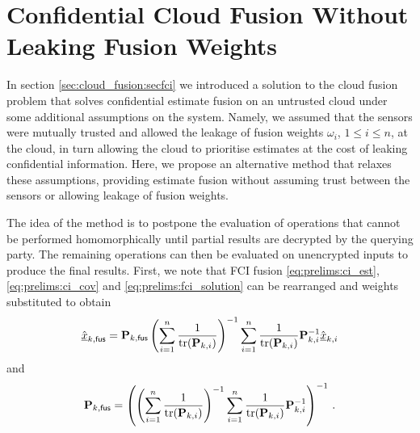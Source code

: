 \section{Confidential Cloud Fusion Without Leaking Fusion Weights}\label{sec:cloud_fusion:secfci2}
In section \ref{sec:cloud_fusion:secfci} we introduced a solution to the cloud fusion problem that solves confidential estimate fusion on an untrusted cloud under some additional assumptions on the system. Namely, we assumed that the sensors were mutually trusted and allowed the leakage of fusion weights $\omega_i$, $1\leq i\leq n$, at the cloud, in turn allowing the cloud to prioritise estimates at the cost of leaking confidential information. Here, we propose an alternative method that relaxes these assumptions, providing estimate fusion without assuming trust between the sensors or allowing leakage of fusion weights. 

The idea of the method is to postpone the evaluation of operations that cannot be performed homomorphically until partial results are decrypted by the querying party. The remaining operations can then be evaluated on unencrypted inputs to produce the final results. First, we note that FCI fusion \eqref{eq:prelims:ci_est}, \eqref{eq:prelims:ci_cov} and \eqref{eq:prelims:fci_solution} can be rearranged and weights substituted to obtain
\begin{equation}\label{eq:cloud_fusion:secfci2_est_rearrange}
    \hat{{\underline{x}}}_{k,\mathsf{fus}} = {{\mathbf{P}}}_{k,\mathsf{fus}}\left(\sum_{i=1}^n \frac{1}{\operatorname{tr}({{\mathbf{P}}}_{k,i})}\right)^{-1}\sum_{i=1}^n\frac{1}{\operatorname{tr}({{\mathbf{P}}}_{k,i})}{{\mathbf{P}}}_{k,i}^{-1}\hat{{\underline{x}}}_{k,i}
\end{equation}
and
\begin{equation}\label{eq:cloud_fusion:secfci2_cov_rearrange}
    {\ensuremath{{\mathbf{P}}}}_{k,\mathsf{fus}} = \left(\left(\sum_{i=1}^n \frac{1}{\operatorname{tr}({{\mathbf{P}}}_{k,i})}\right)^{-1}\sum_{i=1}^n \frac{1}{\operatorname{tr}({{\mathbf{P}}}_{k,i})}{{\mathbf{P}}}_{k,i}^{-1}\right)^{-1}\,.
\end{equation}


